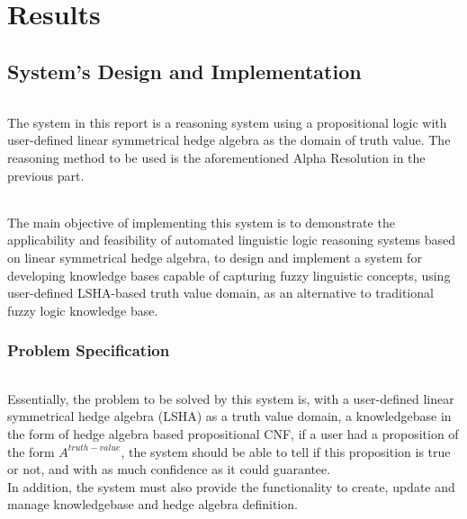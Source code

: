 \documentclass[../gr-final.tex]{subfiles}
\begin{document}
\lstset{language=Haskell}
%
\part{Results}
\chapter{System's Design and Implementation}

\paragraph{} The system in this report is a reasoning system using a
propositional logic with user-defined linear symmetrical hedge algebra
as the domain of truth value. The reasoning method to be used is the
aforementioned Alpha Resolution in the previous part.
	
\paragraph{} The main objective of implementing this system is to demonstrate the applicability and feasibility of automated linguistic logic reasoning systems based on linear symmetrical hedge algebra, to design and implement a system for developing knowledge bases capable of capturing fuzzy linguistic 
concepts, using user-defined LSHA-based truth value domain, as an alternative to traditional fuzzy logic knowledge base.



\section{Problem Specification}

\paragraph{}Essentially, the problem to be solved by this system is,
with a user-defined linear symmetrical hedge algebra (LSHA) as a truth value
domain, a knowledgebase in the form of hedge algebra based
propositional CNF, if a user had a proposition of the form
\(A^{truth-value}\), the system should be able to tell if this
proposition is true or not, and with as much confidence as it could guarantee.\\
In addition, the system must also provide the
functionality to create, update and manage knowledgebase and
hedge algebra definition. 
\end{document}
